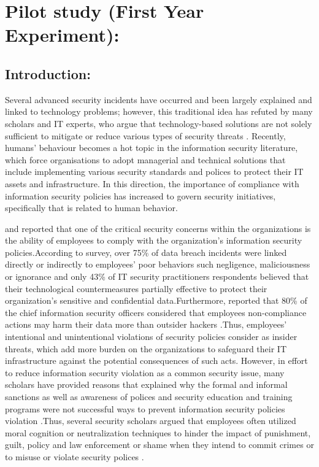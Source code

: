 
\section{Pilot study (First Year Experiment):}
\subsection {Introduction:}
Several advanced security incidents have occurred and been largely explained and linked to technology problems; however, this traditional idea has refuted by many scholars and IT experts, who argue that technology-based solutions are not solely sufficient to mitigate or reduce various types of security threats \cite{Kim2014,Ashenden2008,Safa2015}. Recently, humans' behaviour becomes a hot topic in the information security literature, which force organisations to adopt managerial and technical solutions that include implementing various security standards and polices to protect their IT assets and infrastructure. 
In this direction, the importance of compliance with information security policies has increased to govern security initiatives, specifically that is related to human behavior. \

\cite{Siponen2010} and \cite{Puhakainen2010} reported that one of the critical security concerns within the organizations is the ability of employees to comply with the organization's information security policies.According to \citet{PonemonInstitute2012} survey, over 75\% of data breach incidents were linked directly or indirectly to employees' poor behaviors such negligence, maliciousness or ignorance and only 43\% of IT security practitioners respondents believed that their technological countermeasures partially effective to protect their organization's sensitive and confidential data.Furthermore, \cite{Barlow2013} reported that 80\% of the chief information security officers considered that employees non-compliance actions may harm their data more than outsider hackers .Thus, employees' intentional and unintentional violations of security policies consider as insider threats, which add more burden on the organizations to safeguard their IT infrastructure against the potential consequences of such acts. 
However, in effort to reduce information security violation as a common security issue, many scholars have provided reasons that explained why the formal and informal sanctions as well as awareness of polices and security education and training programs were not successful ways to prevent information security policies violation \cite{Siponen2010,Darcy,Chen2012,}.Thus, several security scholars argued that employees often utilized moral cognition or neutralization techniques to hinder the impact of punishment, guilt, policy and law enforcement or shame when they intend to commit crimes or to misuse or violate security polices \cite{Siponen2010,Barlow2013,Teh2015,Sykes1957,Kim2014,Hinduja2007,Ingram2008}.\
